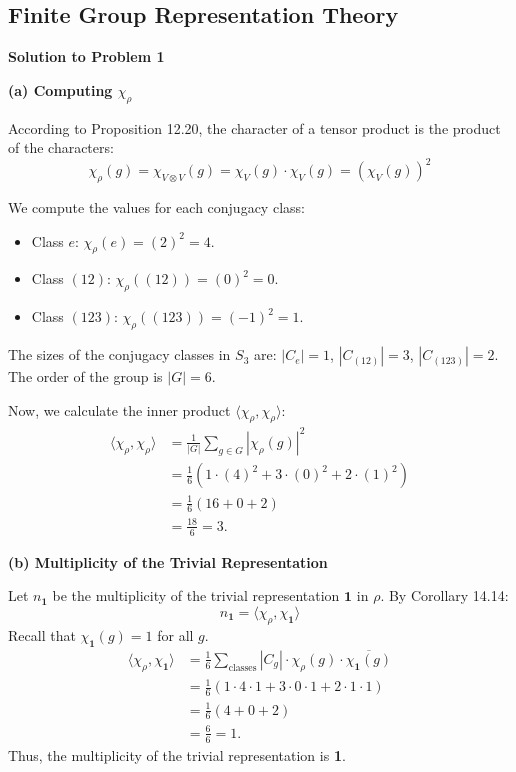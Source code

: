 \documentclass{article}
\begin{document}
\subsection{Finite Group Representation Theory}

\textbf{Solution to Problem 1}

\textbf{(a) Computing $\chi_\rho$}

According to Proposition 12.20, the character of a tensor product is the product of the characters:
\[ \chi_\rho(g) = \chi_{V \otimes V}(g) = \chi_V(g) \cdot \chi_V(g) = (\chi_V(g))^2 \]

We compute the values for each conjugacy class:
\begin{itemize}
    \item Class $e$: $\chi_\rho(e) = (2)^2 = 4$.
    \item Class $(12)$: $\chi_\rho((12)) = (0)^2 = 0$.
    \item Class $(123)$: $\chi_\rho((123)) = (-1)^2 = 1$.
\end{itemize}

The sizes of the conjugacy classes in $S_3$ are: $|C_e| = 1$, $|C_{(12)}| = 3$, $|C_{(123)}| = 2$. The order of the group is $|G| = 6$.

Now, we calculate the inner product $\langle \chi_\rho, \chi_\rho \rangle$:
\[
\begin{aligned}
\langle \chi_\rho, \chi_\rho \rangle &= \frac{1}{|G|} \sum_{g \in G} |\chi_\rho(g)|^2 \\
&= \frac{1}{6} \left( 1 \cdot (4)^2 + 3 \cdot (0)^2 + 2 \cdot (1)^2 \right) \\
&= \frac{1}{6} (16 + 0 + 2) \\
&= \frac{18}{6} = 3.
\end{aligned}
\]

\vspace{1em}
\textbf{(b) Multiplicity of the Trivial Representation}

Let $n_{\mathbf{1}}$ be the multiplicity of the trivial representation $\mathbf{1}$ in $\rho$. By Corollary 14.14:
\[ n_{\mathbf{1}} = \langle \chi_\rho, \chi_{\mathbf{1}} \rangle \]
Recall that $\chi_{\mathbf{1}}(g) = 1$ for all $g$.
\[
\begin{aligned}
\langle \chi_\rho, \chi_{\mathbf{1}} \rangle &= \frac{1}{6} \sum_{\text{classes}} |C_g| \cdot \chi_\rho(g) \cdot \overline{\chi_{\mathbf{1}}(g)} \\
&= \frac{1}{6} \left( 1 \cdot 4 \cdot 1 + 3 \cdot 0 \cdot 1 + 2 \cdot 1 \cdot 1 \right) \\
&= \frac{1}{6} (4 + 0 + 2) \\
&= \frac{6}{6} = 1.
\end{aligned}
\]
Thus, the multiplicity of the trivial representation is \textbf{1}.
\end{document}
